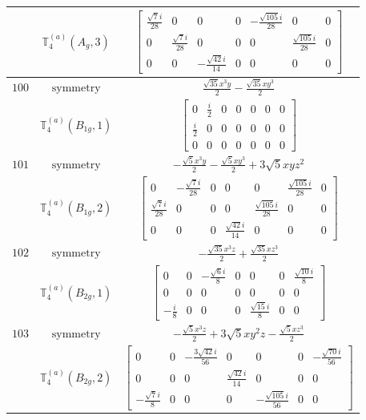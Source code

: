 \documentclass[fleqn,8pt,landscape]{jsarticle}
\begin{document}
\begin{longtable}{ccc}
$  $ & $ \mathbb{T}_{4}^{(a)}(A_{g},3) $ & $ \begin{bmatrix} \frac{\sqrt{7} i}{28} & 0 & 0 & 0 & - \frac{\sqrt{105} i}{28} & 0 & 0 \\ 0 & \frac{\sqrt{7} i}{28} & 0 & 0 & 0 & \frac{\sqrt{105} i}{28} & 0 \\ 0 & 0 & - \frac{\sqrt{42} i}{14} & 0 & 0 & 0 & 0 \end{bmatrix} $ \\ \hline
$ 100 $ & $ \text{symmetry} $ & $ \frac{\sqrt{35} x^{3} y}{2} - \frac{\sqrt{35} x y^{3}}{2} $ \\
$  $ & $ \mathbb{T}_{4}^{(a)}(B_{1g},1) $ & $ \begin{bmatrix} 0 & \frac{i}{2} & 0 & 0 & 0 & 0 & 0 \\ \frac{i}{2} & 0 & 0 & 0 & 0 & 0 & 0 \\ 0 & 0 & 0 & 0 & 0 & 0 & 0 \end{bmatrix} $ \\ \hline
$ 101 $ & $ \text{symmetry} $ & $ - \frac{\sqrt{5} x^{3} y}{2} - \frac{\sqrt{5} x y^{3}}{2} + 3 \sqrt{5} x y z^{2} $ \\
$  $ & $ \mathbb{T}_{4}^{(a)}(B_{1g},2) $ & $ \begin{bmatrix} 0 & - \frac{\sqrt{7} i}{28} & 0 & 0 & 0 & \frac{\sqrt{105} i}{28} & 0 \\ \frac{\sqrt{7} i}{28} & 0 & 0 & 0 & \frac{\sqrt{105} i}{28} & 0 & 0 \\ 0 & 0 & 0 & \frac{\sqrt{42} i}{14} & 0 & 0 & 0 \end{bmatrix} $ \\ \hline
$ 102 $ & $ \text{symmetry} $ & $ - \frac{\sqrt{35} x^{3} z}{2} + \frac{\sqrt{35} x z^{3}}{2} $ \\
$  $ & $ \mathbb{T}_{4}^{(a)}(B_{2g},1) $ & $ \begin{bmatrix} 0 & 0 & - \frac{\sqrt{6} i}{8} & 0 & 0 & 0 & \frac{\sqrt{10} i}{8} \\ 0 & 0 & 0 & 0 & 0 & 0 & 0 \\ - \frac{i}{8} & 0 & 0 & 0 & \frac{\sqrt{15} i}{8} & 0 & 0 \end{bmatrix} $ \\ \hline
$ 103 $ & $ \text{symmetry} $ & $ - \frac{\sqrt{5} x^{3} z}{2} + 3 \sqrt{5} x y^{2} z - \frac{\sqrt{5} x z^{3}}{2} $ \\
$  $ & $ \mathbb{T}_{4}^{(a)}(B_{2g},2) $ & $ \begin{bmatrix} 0 & 0 & - \frac{3 \sqrt{42} i}{56} & 0 & 0 & 0 & - \frac{\sqrt{70} i}{56} \\ 0 & 0 & 0 & \frac{\sqrt{42} i}{14} & 0 & 0 & 0 \\ - \frac{\sqrt{7} i}{8} & 0 & 0 & 0 & - \frac{\sqrt{105} i}{56} & 0 & 0 \end{bmatrix} $ \\ \hline

\end{longtable}
\end{document}
